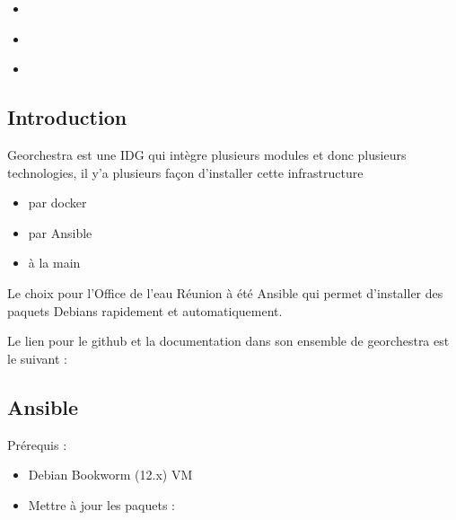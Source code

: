 \documentclass[letterpaper,10pt,french]{sphinxmanual}
\begin{document}
\begin{sphinxShadowBox}
\begin{itemize}
\item {} 
\sphinxAtStartPar
{}\label{\detokenize{doc_instal/installation:id9}}{\hyperref[\detokenize{doc_instal/installation:personnalisation-du-geoserver}]{}}

\item {} 
\sphinxAtStartPar
{}\label{\detokenize{doc_instal/installation:id10}}{\hyperref[\detokenize{doc_instal/installation:relancer-l-infrastructure}]{}}

\item {} 
\sphinxAtStartPar
{}\label{\detokenize{doc_instal/installation:id11}}{\hyperref[\detokenize{doc_instal/installation:se-rendre-sur-l-application}]{}}

\end{itemize}
\end{sphinxShadowBox}


\subsection{Introduction}
\label{\detokenize{doc_instal/installation:introduction}}
\sphinxAtStartPar
Georchestra est une IDG qui intègre plusieurs modules et donc plusieurs technologies, il y’a plusieurs façon d’installer cette infrastructure
\begin{itemize}
\item {} 
\sphinxAtStartPar
par docker

\item {} 
\sphinxAtStartPar
par Ansible

\item {} 
\sphinxAtStartPar
à la main

\end{itemize}

\sphinxAtStartPar
Le choix pour l’Office de l’eau Réunion à été Ansible qui permet d’installer des paquets Debians rapidement et automatiquement.

\sphinxAtStartPar
Le lien pour le github et la documentation dans son ensemble de georchestra est le suivant : 


\subsection{Ansible}
\label{\detokenize{doc_instal/installation:ansible}}
\sphinxAtStartPar
Prérequis :
\begin{itemize}
\item {} 
\sphinxAtStartPar
Debian Bookworm (12.x) VM

\item {} 
\sphinxAtStartPar
Mettre à jour les paquets :

\end{itemize}
\end{document}
